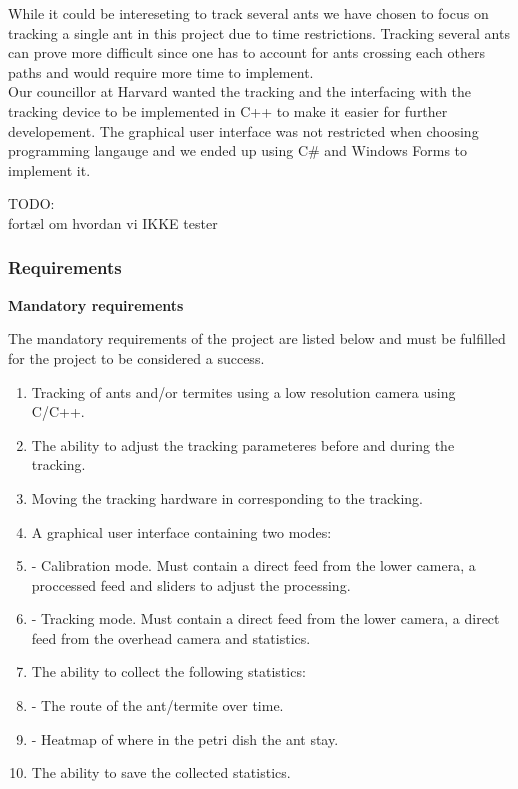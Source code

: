 While it could be intereseting to track several ants we have chosen to focus on tracking a single ant in this project due to time restrictions. Tracking several ants can prove more difficult since one has to account for ants crossing each others paths and would require more time to implement.\\

Our councillor at Harvard wanted the tracking and the interfacing with the tracking device to be implemented in C++ to make it easier for further developement. The graphical user interface was not restricted when choosing programming langauge and we ended up using C\# and Windows Forms to implement it.

TODO: \\
fortæl om hvordan vi IKKE tester

\subsubsection{Requirements} \mbox{}\par
\label{requirements}
\noindent \textbf{Mandatory requirements} \par
The mandatory requirements of the project are listed below and must be fulfilled for the project to be considered a success.

\begin{enumerate}
    \item Tracking of ants and/or termites using a low resolution camera using C/C++.
    \item The ability to adjust the tracking parameteres before and during the tracking.
    \item Moving the tracking hardware in corresponding to the tracking.
	\item A graphical user interface containing two modes:
    \item - Calibration mode. Must contain a direct feed from the lower camera, a proccessed feed and sliders to adjust the processing.
    \item - Tracking mode. Must contain a direct feed from the lower camera, a direct feed from the overhead camera and statistics.
    \item The ability to collect the following statistics:
    \item - The route of the ant/termite over time. 
    \item - Heatmap of where in the petri dish the ant stay.
    \item The ability to save the collected statistics.
\end{enumerate}

